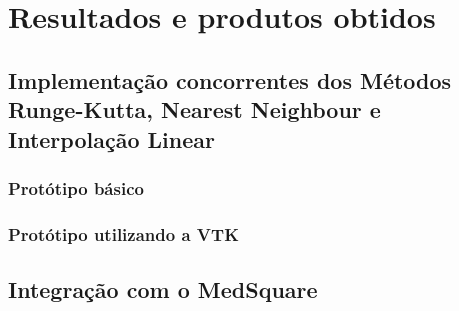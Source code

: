 \chapter{Resultados e produtos obtidos}

\section{Implementação concorrentes dos Métodos Runge-Kutta, Nearest Neighbour e Interpolação Linear}
  \subsection{Protótipo básico}
  \subsection{Protótipo utilizando a VTK}
\section{Integração com o MedSquare}
